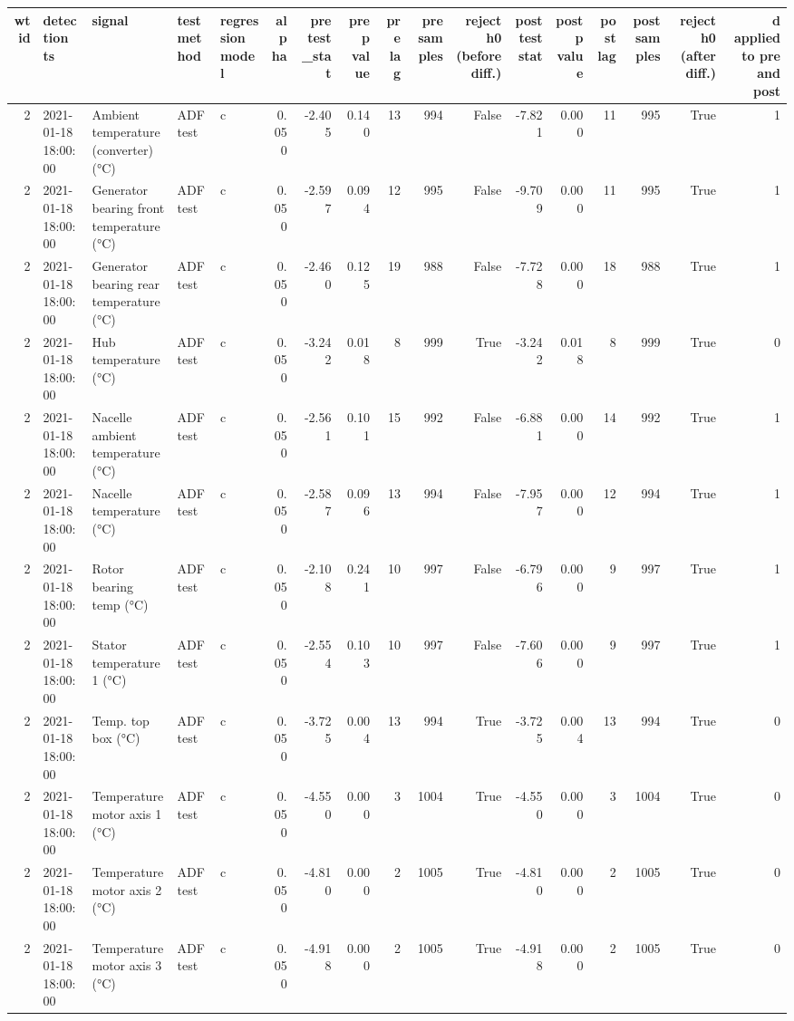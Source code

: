 \begin{tabular}{rllllrrrrrrrrrrrr}
\toprule
wt id & detection ts & signal & test method & regression model & alpha & pre test\_stat & pre p value & pre lag & pre samples & reject h0 (before diff.) & post teststat & post p value & post lag & post samples & reject h0 (after diff.) & d applied to pre and post \\
\midrule
2 & 2021-01-18 18:00:00 & Ambient temperature (converter) (°C) & ADF test & c & 0.050 & -2.405 & 0.140 & 13 & 994 & False & -7.821 & 0.000 & 11 & 995 & True & 1 \\
2 & 2021-01-18 18:00:00 & Generator bearing front temperature (°C) & ADF test & c & 0.050 & -2.597 & 0.094 & 12 & 995 & False & -9.709 & 0.000 & 11 & 995 & True & 1 \\
2 & 2021-01-18 18:00:00 & Generator bearing rear temperature (°C) & ADF test & c & 0.050 & -2.460 & 0.125 & 19 & 988 & False & -7.728 & 0.000 & 18 & 988 & True & 1 \\
2 & 2021-01-18 18:00:00 & Hub temperature (°C) & ADF test & c & 0.050 & -3.242 & 0.018 & 8 & 999 & True & -3.242 & 0.018 & 8 & 999 & True & 0 \\
2 & 2021-01-18 18:00:00 & Nacelle ambient temperature (°C) & ADF test & c & 0.050 & -2.561 & 0.101 & 15 & 992 & False & -6.881 & 0.000 & 14 & 992 & True & 1 \\
2 & 2021-01-18 18:00:00 & Nacelle temperature (°C) & ADF test & c & 0.050 & -2.587 & 0.096 & 13 & 994 & False & -7.957 & 0.000 & 12 & 994 & True & 1 \\
2 & 2021-01-18 18:00:00 & Rotor bearing temp (°C) & ADF test & c & 0.050 & -2.108 & 0.241 & 10 & 997 & False & -6.796 & 0.000 & 9 & 997 & True & 1 \\
2 & 2021-01-18 18:00:00 & Stator temperature 1 (°C) & ADF test & c & 0.050 & -2.554 & 0.103 & 10 & 997 & False & -7.606 & 0.000 & 9 & 997 & True & 1 \\
2 & 2021-01-18 18:00:00 & Temp. top box (°C) & ADF test & c & 0.050 & -3.725 & 0.004 & 13 & 994 & True & -3.725 & 0.004 & 13 & 994 & True & 0 \\
2 & 2021-01-18 18:00:00 & Temperature motor axis 1 (°C) & ADF test & c & 0.050 & -4.550 & 0.000 & 3 & 1004 & True & -4.550 & 0.000 & 3 & 1004 & True & 0 \\
2 & 2021-01-18 18:00:00 & Temperature motor axis 2 (°C) & ADF test & c & 0.050 & -4.810 & 0.000 & 2 & 1005 & True & -4.810 & 0.000 & 2 & 1005 & True & 0 \\
2 & 2021-01-18 18:00:00 & Temperature motor axis 3 (°C) & ADF test & c & 0.050 & -4.918 & 0.000 & 2 & 1005 & True & -4.918 & 0.000 & 2 & 1005 & True & 0 \\

\end{tabular}
